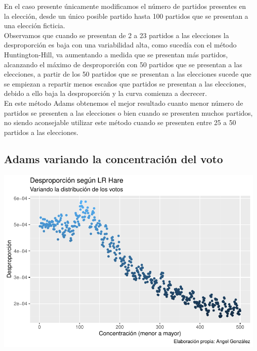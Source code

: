 \documentclass[12pt,a4paper,]{book}
\numberwithin{dummy}{section}
\theoremstyle{ocrenumbox}
\theoremstyle{blacknumex}
\theoremstyle{blacknumbox}
\theoremstyle{ocrenum}
\theoremstyle{ocrenum}
\begin{document}
En el caso presente únicamente modificamos el número de partidos
presentes en la elección, desde un único posible partido hasta 100
partidos que se presentan a una elección ficticia.\\
Observamos que cuando se presentan de 2 a 23 partidos a las elecciones
la desproporción es baja con una variabilidad alta, como sucedía con el
método Huntington-Hill, va aumentando a medida que se presentan más
partidos, alcanzando el máximo de desproporción con 50 partidos que se
presentan a las elecciones, a partir de los 50 partidos que se presentan
a las elecciones sucede que se empiezan a repartir menos escaños que
partidos se presentan a las elecciones, debido a ello baja la
desproporción y la curva comienza a decrecer.\\
En este método Adams obtenemos el mejor resultado cuanto menor número de
partidos se presenten a las elecciones o bien cuando se presenten muchos
partidos, no siendo aconsejable utilizar este método cuando se presenten
entre 25 a 50 partidos a las elecciones.

\hypertarget{adams-variando-la-concentraciuxf3n-del-voto}{%
\subsection{Adams variando la concentración del
voto}\label{adams-variando-la-concentraciuxf3n-del-voto}}

\begin{center}\includegraphics[width=0.95\linewidth]{figurasR/unnamed-chunk-43-1} \end{center}
\end{document}
